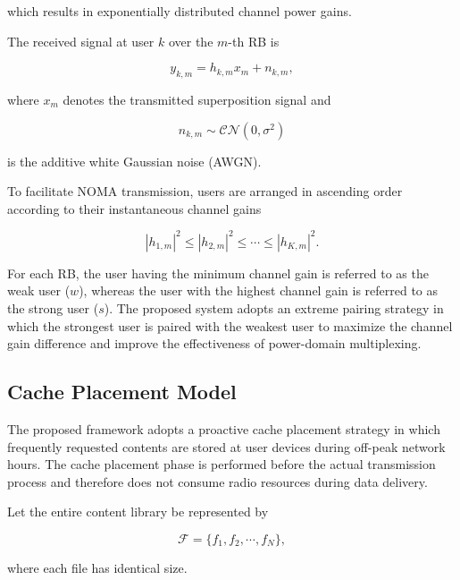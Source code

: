\documentclass[conference]{IEEEtran}
\begin{document}
which results in exponentially distributed channel power gains.

The received signal at user $k$ over the $m$-th RB is

\begin{equation}
y_{k,m}
=
h_{k,m}x_m+n_{k,m},
\label{eq:received_signal}
\end{equation}

where $x_m$ denotes the transmitted superposition signal and

\begin{equation}
n_{k,m}\sim\mathcal{CN}(0,\sigma^2)
\end{equation}

is the additive white Gaussian noise (AWGN).

To facilitate NOMA transmission, users are arranged in ascending order according to their instantaneous channel gains

\begin{equation}
|h_{1,m}|^2
\le
|h_{2,m}|^2
\le
\cdots
\le
|h_{K,m}|^2.
\label{eq:ordering}
\end{equation}

For each RB, the user having the minimum channel gain is referred to as the weak user ($w$), whereas the user with the highest channel gain is referred to as the strong user ($s$). The proposed system adopts an extreme pairing strategy in which the strongest user is paired with the weakest user to maximize the channel gain difference and improve the effectiveness of power-domain multiplexing.

\subsection{Cache Placement Model}

The proposed framework adopts a proactive cache placement strategy in which frequently requested contents are stored at user devices during off-peak network hours. The cache placement phase is performed before the actual transmission process and therefore does not consume radio resources during data delivery.

Let the entire content library be represented by

\begin{equation}
\mathcal{F}
=
\{f_1,f_2,\cdots,f_N\},
\end{equation}

where each file has identical size.
\end{document}
